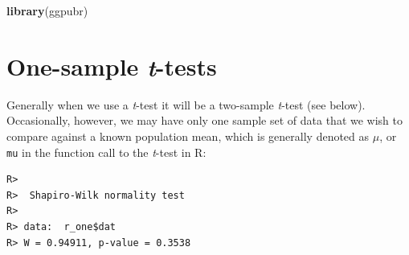 \documentclass[english,10pt,a4paper,oneside]{book}
\newenvironment{Shaded}{\begin{snugshade}}{\end{snugshade}}
\newcommand{\KeywordTok}[1]{\textcolor[rgb]{0.13,0.29,0.53}{\textbf{#1}}}
\newcommand{\DataTypeTok}[1]{\textcolor[rgb]{0.13,0.29,0.53}{#1}}
\newcommand{\DecValTok}[1]{\textcolor[rgb]{0.00,0.00,0.81}{#1}}
\newcommand{\StringTok}[1]{\textcolor[rgb]{0.31,0.60,0.02}{#1}}
\newcommand{\CommentTok}[1]{\textcolor[rgb]{0.56,0.35,0.01}{\textit{#1}}}
\newcommand{\OperatorTok}[1]{\textcolor[rgb]{0.81,0.36,0.00}{\textbf{#1}}}
\newcommand{\NormalTok}[1]{#1}
\theoremstyle{definition}
\theoremstyle{definition}
\theoremstyle{definition}
\theoremstyle{remark}
\begin{document}
\begin{Shaded}
\begin{Highlighting}[]
\KeywordTok{library}\NormalTok{(ggpubr)}
\end{Highlighting}
\end{Shaded}

\section{\texorpdfstring{One-sample
\emph{t}-tests}{One-sample t-tests}}\label{one-sample-t-tests}

Generally when we use a \emph{t}-test it will be a two-sample
\emph{t}-test (see below). Occasionally, however, we may have only one
sample set of data that we wish to compare against a known population
mean, which is generally denoted as \(\mu\), or \texttt{mu} in the
function call to the \emph{t}-test in R:

\begin{Shaded}
\end{Shaded}

\begin{verbatim}
R> 
R>  Shapiro-Wilk normality test
R> 
R> data:  r_one$dat
R> W = 0.94911, p-value = 0.3538
\end{verbatim}

\begin{Shaded}
\end{Shaded}
\end{document}

